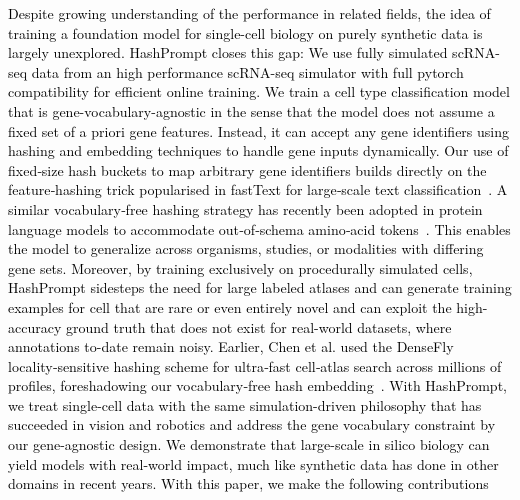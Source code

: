 \documentclass{article}
\newcommand{\phflo}[1]{\textcolor{black}{#1}}
\begin{document}
\phflo{Despite growing understanding of the performance in related fields, the idea of training a foundation model for single-cell biology on purely synthetic data is largely unexplored. 
HashPrompt closes this gap: We use fully simulated scRNA-seq data from an high performance scRNA-seq simulator with full pytorch compatibility for efficient online training. We train a cell type classification model that is gene-vocabulary-agnostic in the sense that the model does not assume a fixed set of  a priori gene features. Instead, it can accept any gene identifiers using hashing and embedding techniques to handle gene inputs dynamically. Our use of fixed‑size hash buckets to map arbitrary gene identifiers builds directly on the feature‑hashing trick popularised in fastText for large‑scale text classification \cite{joulin2017bag}. A similar vocabulary‑free hashing strategy has recently been adopted in protein language models to accommodate out‑of‑schema amino‑acid tokens \cite{nijkamp2023protbert}.
This enables the model to generalize across organisms, studies, or modalities with differing gene sets. Moreover, by training exclusively on procedurally simulated cells, HashPrompt sidesteps the need for large labeled atlases and can generate training examples for cell   that are rare or even entirely novel and can exploit the high-accuracy ground truth that does not exist for real-world datasets, where annotations to-date remain noisy.
Earlier, Chen et al. used the DenseFly locality‑sensitive hashing scheme for ultra‑fast cell‑atlas search across millions of profiles, foreshadowing our vocabulary‑free hash embedding \cite{chen2020using}.
With HashPrompt, we treat single-cell data with the same simulation-driven philosophy that has succeeded in vision and robotics and address the gene vocabulary constraint by our gene-agnostic design. 
We demonstrate that large-scale in silico biology can yield models with real-world impact, much like synthetic data has done in other domains in recent years. 
With this paper, we make the following contributions
}
\end{document}
